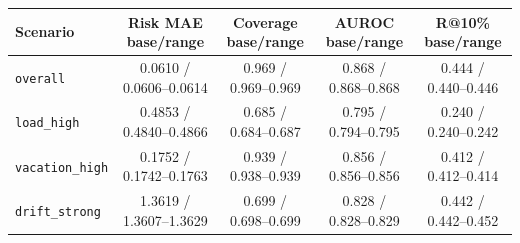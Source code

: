 \begin{tabular}{lcccc}
\hline
Scenario & Risk MAE base/range & Coverage base/range & AUROC base/range & R@10\% base/range \\
\hline
\texttt{overall} & 0.0610 / 0.0606--0.0614 & 0.969 / 0.969--0.969 & 0.868 / 0.868--0.868 & 0.444 / 0.440--0.446 \\
\texttt{load\_high} & 0.4853 / 0.4840--0.4866 & 0.685 / 0.684--0.687 & 0.795 / 0.794--0.795 & 0.240 / 0.240--0.242 \\
\texttt{vacation\_high} & 0.1752 / 0.1742--0.1763 & 0.939 / 0.938--0.939 & 0.856 / 0.856--0.856 & 0.412 / 0.412--0.414 \\
\texttt{drift\_strong} & 1.3619 / 1.3607--1.3629 & 0.699 / 0.698--0.699 & 0.828 / 0.828--0.829 & 0.442 / 0.442--0.452 \\
\hline
\end{tabular}
